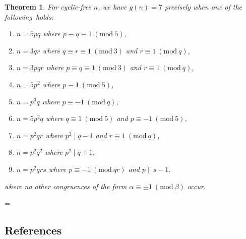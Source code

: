 \documentclass[a4paper, 12pt]{article}
\newenvironment{keepintact}
  {\par\nobreak\vfil\penalty0\vfilneg
   \vtop\bgroup}
  {\par\xdef\tpd{\the\prevdepth}\egroup
   \prevdepth=\tpd}
\newcommand{\Mod}[1]{\ (\mathrm{mod} \ #1)}
\theoremstyle{plain}
\newtheorem{thm}{Theorem}[section]
\theoremstyle{definition}
\begin{document}
\begin{keepintact}
\begin{thm}
	For cyclic-free $n$, we have $g(n) = 7$ precisely when one of the \mbox{following holds:}
	\begin{enumerate}	\listspace
		\item $n = 5pq$ where $p \equiv q \equiv 1 \Mod{5}$,
		\item $n = 3qr$ where $q \equiv r \equiv 1 \Mod{3}$ and $r \equiv 1 \Mod{q}$,
		\item $n = 3pqr$ where $p \equiv q \equiv 1 \Mod{3}$ and $r \equiv 1 \Mod{q}$,
		\item $n = 5p^2$ where $p \equiv 1 \Mod{5}$,
		\item $n = p^3 q$ where $p \equiv -1 \Mod{q}$,
		\item $n = 5p^2 q$ where $q \equiv 1 \Mod{5}$ and $p \equiv -1 \Mod{5}$,
		\item $n = p^2 q r$ where $p^2 \mid q - 1$ and $r \equiv 1 \Mod{q}$,
		\item $n = p^2 q^2$ where $p^2 \mid q + 1$,
		\item $n = p^2 q r s$ where $p \equiv -1 \Mod{qr}$ and $p \parallel s - 1$.
	\end{enumerate} \textspace
	where no other congruences of the form $\alpha \equiv \pm 1 \Mod{\beta}$ \nolinebreak[4] \mbox{occur}.
\end{thm}
\end{keepintact}

\begin{center}\section*{References}\end{center}
\printbibliography[heading=none]
\end{document}
